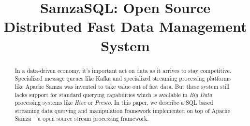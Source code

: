 \documentclass[10pt, conference, compsocconf]{IEEEtran}
\begin{document}
%
\title{SamzaSQL: Open Source Distributed Fast Data Management System}




\author{
}

\maketitle


\begin{abstract}
In a data-driven economy, it's important act on data as it arrives to stay competitive. Specialized message queues like Kafka and specialized streaming processing platforms like Apache Samza was invented to take value out of fast data. But these system still lacks support for standard querying capabilities which is available in \textit{Big Data} processing systems like \textit{Hive} or \textit{Presto}. In this paper, we describe a SQL based streaming data querying and manipulation framework implemented on top of Apache Samza -- a open source stream processing framework.
\end{abstract}
\end{document}

